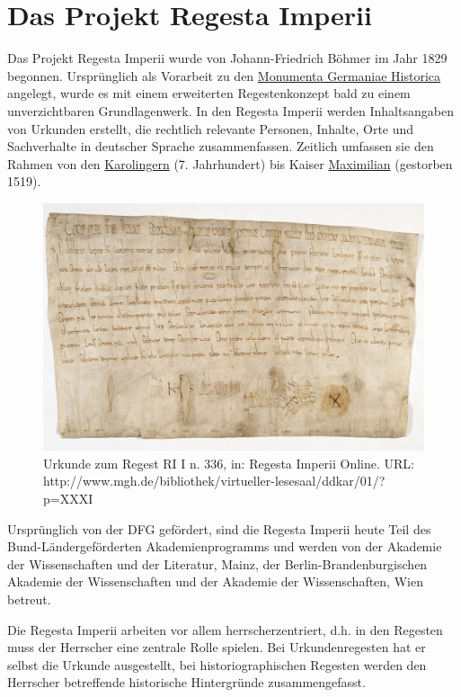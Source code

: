 \documentclass[ngerman,]{scrreprt}
\begin{document}
\hypertarget{das-projekt-regesta-imperii}{%
\section{Das Projekt Regesta Imperii}\label{das-projekt-regesta-imperii}}

Das Projekt Regesta Imperii wurde von Johann-Friedrich Böhmer im Jahr 1829 begonnen. Ursprünglich als Vorarbeit zu den \href{https://www.mgh.de}{Monumenta Germaniae Historica} angelegt, wurde es mit einem erweiterten Regestenkonzept bald zu einem unverzichtbaren Grundlagenwerk. In den Regesta Imperii werden Inhaltsangaben von Urkunden erstellt, die rechtlich relevante Personen, Inhalte, Orte und Sachverhalte in deutscher Sprache zusammenfassen. Zeitlich umfassen sie den Rahmen von den \href{https://de.wikipedia.org/wiki/Karolinger}{Karolingern} (7. Jahrhundert) bis Kaiser \href{https://de.wikipedia.org/wiki/Maximilian_I._(HRR)}{Maximilian} (gestorben 1519).

\begin{figure}
\centering
\includegraphics{Bilder/Beispielurkunde.jpg}
\caption{Urkunde zum Regest RI I n. 336, in: Regesta Imperii Online. URL: http://www.mgh.de/bibliothek/virtueller-lesesaal/ddkar/01/?p=XXXI}
\end{figure}

Ursprünglich von der DFG gefördert, sind die Regesta Imperii heute Teil des Bund-Ländergeförderten Akademienprogramms und werden von der Akademie der Wissenschaften und der Literatur, Mainz, der Berlin-Brandenburgischen Akademie der Wissenschaften und der Akademie der Wissenschaften, Wien betreut.

Die Regesta Imperii arbeiten vor allem herrscherzentriert, d.h. in den Regesten muss der Herrscher eine zentrale Rolle spielen. Bei Urkundenregesten hat er selbst die Urkunde ausgestellt, bei historiographischen Regesten werden den Herrscher betreffende historische Hintergründe zusammengefasst.
\end{document}
